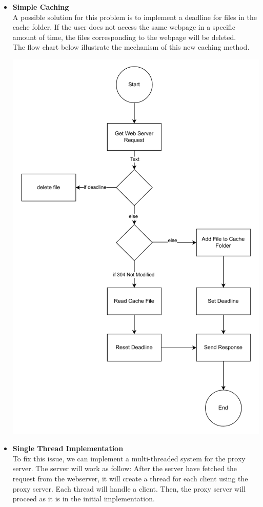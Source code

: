 \documentclass[11pt]{article}
\begin{document}
\begin{enumerate}
\begin{itemize}
				\item \textbf{Simple Caching}\\
					A possible solution for this problem is to implement a deadline for files in the cache folder. If the user does not access the same webpage in a specific amount of time, the files corresponding to the webpage will be deleted. \\
					The flow chart below illustrate the mechanism of this new caching method. 
					\begin{center}
						\includegraphics[scale=0.4]{cache.png}
					\end{center}
					\pagebreak
				\item \textbf{Single Thread Implementation}\\
					To fix this issue, we can implement a multi-threaded system for the proxy server. The server will work as follow: After the server have fetched the request from the webserver, it will create a thread for each client using the proxy server. Each thread will handle a client. Then, the proxy server will proceed as it is in the initial implementation.

\end{itemize}
\end{enumerate}
\end{document}
